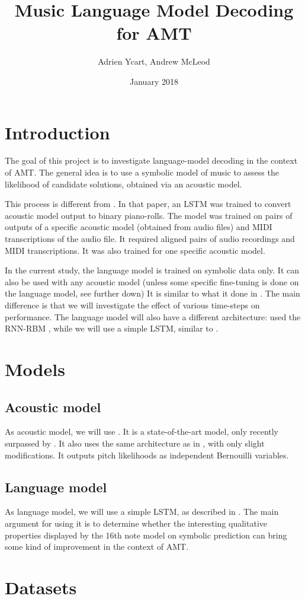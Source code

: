 \documentclass{article}
\title{Music Language Model Decoding for AMT}
\author{Adrien Ycart, Andrew McLeod}
\date{January 2018}
\begin{document}
\maketitle

\section{Introduction}

The goal of this project is to investigate language-model decoding in the context of AMT.
The general idea is to use a symbolic model of music to assess the likelihood of candidate solutions, obtained via an acoustic model.

This process is different from \cite{ycart2018polyphonic}.
In that paper, an LSTM was trained to convert acoustic model output to binary piano-rolls.
The model was trained on pairs of outputs of a specific acoustic model (obtained from audio files) and MIDI transcriptions of the audio file.
It required aligned pairs of audio recordings and MIDI transcriptions.
It was also trained for one specific acoustic model.

In the current study, the language model is trained on symbolic data only.
It can also be used with any acoustic model (unless some specific fine-tuning is done on the language model, see further down)
It is similar to what it done in \cite{sigtia2016end}.
The main difference is that we will investigate the effect of various time-steps on performance. 
The language model will also have a different architecture: 
\cite{sigtia2016end} used the RNN-RBM \cite{Boulanger-Lewandowski2012}, while we will use a simple LSTM, similar to \cite{Ycart2017}.


\section{Models}

\subsection{Acoustic model}

As acoustic model, we will use \cite{Kelz2016}.
It is a state-of-the-art model, only recently surpassed by \cite{Hawthorne2018}.
It also uses the same architecture as in \cite{sigtia2016end}, with only slight modifications.
It outputs pitch likelihoods as independent Bernouilli variables.

\subsection{Language model}

As language model, we will use a simple LSTM, as described in \cite{Ycart2017}.
The main argument for using it is to determine whether the interesting qualitative properties displayed by the 16th note model on symbolic prediction can bring some kind of improvement in the context of AMT.

\section{Datasets}





\end{document}
